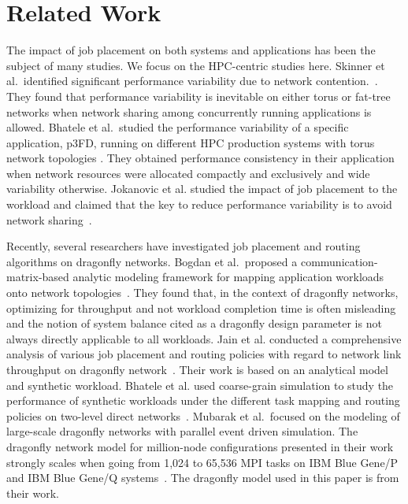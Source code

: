\section{Related Work}
\label{sec:related work}

The impact of job placement on both systems and applications has been the subject of many studies.
We focus on the HPC-centric studies here. Skinner et al.\ identified significant performance variability due to network contention.~\cite{dskinner}. They found that performance variability is inevitable on either torus or fat-tree networks when network sharing among concurrently running applications is allowed.
Bhatele et al.\ studied the performance variability of a specific application, p3FD, running on different HPC production systems with torus network topologies \cite{abhinav-sc13}. They obtained performance consistency in their application when network resources were allocated compactly and exclusively and wide variability otherwise. Jokanovic et al. studied the impact of job placement to the workload and claimed that the key to reduce performance variability is to avoid network sharing~\cite{jose-ipdps15}. 

Recently, several researchers have investigated job placement and routing algorithms on dragonfly networks. Bogdan et al.\ proposed a communication-matrix-based analytic modeling framework for mapping application workloads onto network topologies~\cite{hoefler-hpdc14}. They found that, in the context of dragonfly networks, optimizing for throughput and not workload completion time is often misleading and the notion of system balance cited as a dragonfly design parameter is not always directly applicable to all workloads.
Jain et al. conducted a comprehensive analysis of various job placement and routing policies with regard to network link throughput on dragonfly network~\cite{jain-sc14}. Their work is based on an analytical model and synthetic workload. Bhatele et al. used coarse-grain simulation to study the performance of synthetic workloads under the different task mapping and routing policies on two-level direct networks~\cite{bhatele-sc11}. Mubarak et al.\ focused on  the modeling of large-scale dragonfly networks with parallel event driven simulation. The dragonfly network model for million-node configurations presented in their work strongly scales when going from 1,024 to 65,536 MPI tasks on IBM Blue Gene/P and IBM Blue Gene/Q systems~\cite{codes-dragonfly}. The dragonfly model used in this paper is from their work. 

